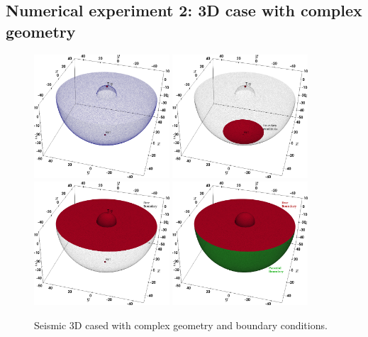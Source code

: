 \documentclass{report}
\begin{document}
\subsection{Numerical experiment 2: 3D case with complex geometry}

\begin{figure}
    \centering
    \includegraphics[width=0.45\textwidth]{./Images/top-bot.png}        \includegraphics[width=0.45\textwidth]{./Images/top-bot-bc.png}\\
    \includegraphics[width=0.45\textwidth]{./Images/top-bot-bc1.png}        \includegraphics[width=0.45\textwidth]{./Images/top-bot-bc2.png}\\
    \caption{Seismic 3D cased with complex geometry and boundary conditions.}
    \label{fig:soilsemiCastemPSD3D}
\end{figure}
\end{document}
